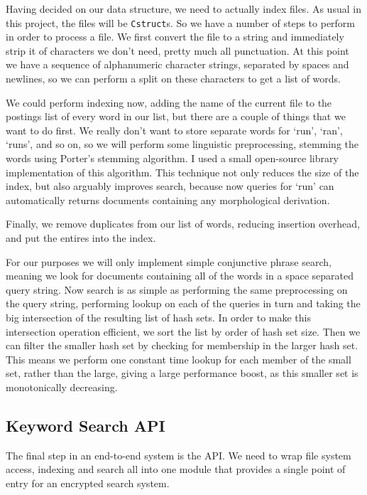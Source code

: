 \documentclass[12pt,a4paper,twoside,openright]{report}
\begin{document}
Having decided on our data structure, we need to actually index files. As usual in this project, the files will be \texttt{Cstruct}s. So we have a number of steps to perform in order to process a file. We first convert the file to a string and immediately strip it of characters we don't need, pretty much all punctuation. At this point we have a sequence of alphanumeric character strings, separated by spaces and newlines, so we can perform a split on these characters to get a list of words.

We could perform indexing now, adding the name of the current file to the postings list of every word in our list, but there are a couple of things that we want to do first. We really don't want to store separate words for `run', `ran', `runs', and so on, so we will perform some linguistic preprocessing, stemming the words using Porter's stemming algorithm. I used a small open-source library implementation of this algorithm. This technique not only reduces the size of the index, but also arguably improves search, because now queries for `run' can automatically returns documents containing any morphological derivation.

Finally, we remove duplicates from our list of words, reducing insertion overhead, and put the entires into the index.

For our purposes we will only implement simple conjunctive phrase search, meaning we look for documents containing all of the words in a space separated query string. Now search is as simple as performing the same preprocessing on the query string, performing lookup on each of the queries in turn and taking the big intersection of the resulting list of hash sets. In order to make this intersection operation efficient, we sort the list by order of hash set size. Then we can filter the smaller hash set by checking for membership in the larger hash set. This means we perform one constant time lookup for each member of the small set, rather than the large, giving a large performance boost, as this smaller set is monotonically decreasing.

\subsection{Keyword Search API}
\label{subsec:searchapi}

The final step in an end-to-end system is the API. We need to wrap file system access, indexing and search all into one module that provides a single point of entry for an encrypted search system.
\end{document}
